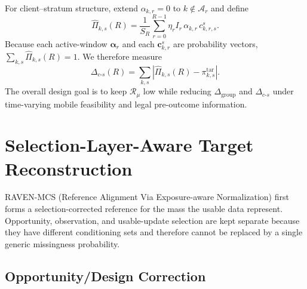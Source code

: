\documentclass[letterpaper,journal]{IEEEtran}
\begin{document}
For client--stratum structure, extend $\alpha_{k,r}=0$ to
$k\notin\mathcal{A}_r$ and define
\begin{equation}
 \widehat\Pi_{k,s}(R)
 =
 \frac{1}{S_R}
 \sum_{r=0}^{R-1}
 \eta_r I_r\,
 \alpha_{k,r}\,
 c^{s}_{k,r,s}.
 \label{eq:Pi_hat_ks}
\end{equation}
Because each active-window $\boldsymbol\alpha_r$ and each
$\mathbf{c}^{s}_{k,r}$ are probability vectors,
$\sum_{k,s}\widehat\Pi_{k,s}(R)=1$.  We therefore measure
\begin{equation}
 \Delta_{c\text{-}s}(R)
 =
 \sum_{k,s}
 \left|
 \widehat\Pi_{k,s}(R)-\pi^{\mathrm{tar}}_{k,s}
 \right|.
 \label{eq:delta_cs}
\end{equation}
The overall design goal is to keep $\mathcal{R}_{\mu}$ low while
reducing $\Delta_{\mathrm{group}}$ and $\Delta_{c\text{-}s}$ under
time-varying mobile feasibility and legal pre-outcome information.


\section{Selection-Layer-Aware Target Reconstruction}
\label{sec:reconstruction}

RAVEN-MCS (Reference Alignment Via Exposure-aware Normalization) first forms a
selection-corrected reference for the mass the usable data represent.
Opportunity, observation, and usable-update selection are kept separate
because they have different conditioning sets and therefore cannot be
replaced by a single generic missingness probability.

\subsection{Opportunity/Design Correction}
\label{subsec:design_correction}
\end{document}
